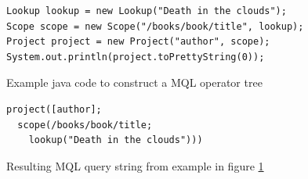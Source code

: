 \begin{figure}[htp]
\begin{center}
  \begin{Verbatim}
Lookup lookup = new Lookup("Death in the clouds");
Scope scope = new Scope("/books/book/title", lookup);
Project project = new Project("author", scope);
System.out.println(project.toPrettyString(0));
  \end{Verbatim}
  \caption{Example java code to construct a MQL operator tree}
  \label{fig:impl:mql_op_ex1_java}
\end{center}
\end{figure}

\begin{figure}[htp]
\begin{center}
  \begin{Verbatim}
project([author];
  scope(/books/book/title;
    lookup("Death in the clouds")))
  \end{Verbatim}
  \caption{Resulting MQL query string from example in figure
  \ref{fig:impl:mql_op_ex1_java}}
  \label{fig:impl:mql_op_ex1_mql}
\end{center}
\end{figure}
